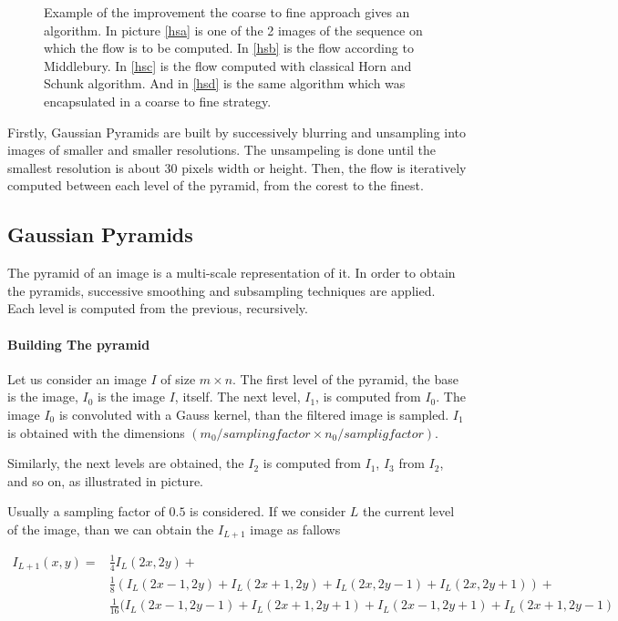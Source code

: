 \documentclass[12pt,a4paper,twoside]{report}
\begin{document}
\begin{figure}
	\caption{Example of the improvement the coarse to fine approach gives an algorithm. In picture \ref{hsa} is one of the 2 images of the sequence on which the flow is to be computed. In \ref{hsb} is the flow according to Middlebury. In \ref{hsc} is the flow computed with classical Horn and Schunk algorithm. And in \ref{hsd} is the same algorithm which was encapsulated in a coarse to fine strategy.}
\end{figure}

 
Firstly, Gaussian Pyramids are built by successively blurring and unsampling into images of smaller and smaller resolutions. The unsampeling is done until the smallest resolution is about 30 pixels width or height.  Then, the flow is iteratively computed between each level of the pyramid, from the corest to the finest.
\subsection{Gaussian Pyramids}
The pyramid of an image is a multi-scale representation of it. In order to obtain the pyramids, successive smoothing and subsampling techniques are applied.  Each level is computed from the previous, recursively.


\paragraph{Building The pyramid} 
 Let us consider an image $I$ of size $m \times n$. The first level of the pyramid, the base is the image, $I_0$ is the image $I$, itself. The next level, $I_1$, is computed from $I_0$. The image $I_0$ is convoluted with a Gauss kernel, than the filtered image is sampled. $I_1$ is obtained with the dimensions $(m_0/sampling factor \times n_0/samplig factor)$. 

Similarly, the next levels are obtained, the $I_2$ is computed from $I_1$, $I_3$ from $I_2$, and so on, as illustrated in picture.

Usually a sampling factor of $0.5$ is considered. If we consider $L$ the current level of the image, than we can obtain the $I_{L+1}$ image as fallows



\begin{equation} \label{eq1}
\begin{split}
I_{L+1}(x,y) = &\frac{1}{4}I_L(2x,2y)+\\
&\frac{1}{8}(I_L(2x-1,2y)+I_L(2x+1,2y)+I_L(2x,2y-1)+I_L(2x,2y+1))+\\
&\frac{1}{16}(I_L(2x-1,2y-1)+I_L(2x+1,2y+1)+I_L(2x-1,2y+1)+I_L(2x+1,2y-1) 
\end{split}
\end{equation}
\end{document}
